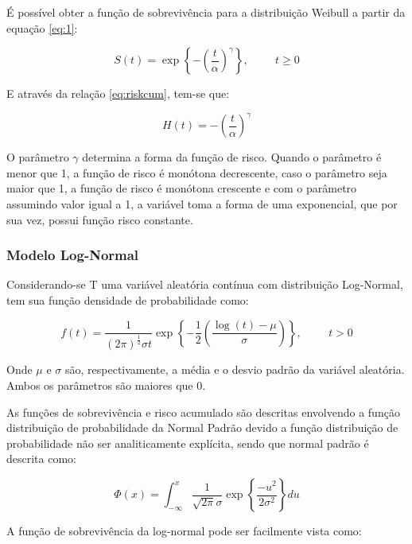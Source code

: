 \documentclass[12pt,a4paper]{article}
\begin{document}
É possível obter a função de sobrevivência para a distribuição Weibull a partir da equação \ref{eq:1}:

\begin{equation} \label{eq:WeiHaz}
S(t) = \exp \left\lbrace - \left( \dfrac{t}{\alpha} \right)^{\gamma} \right\rbrace, \hspace{1cm} t \ge 0
\end{equation}

E através da relação \ref{eq:riskcum}, tem-se que:

\begin{equation} \label{eq:WeRis}
	H(t) = - \left( \dfrac{t}{\alpha} \right)^{\gamma}
\end{equation}

O parâmetro $\gamma$ determina a forma da função de risco. Quando o parâmetro é menor que 1, a função de risco é monótona decrescente, caso o parâmetro seja maior que 1, a função de risco é monótona crescente e com o parâmetro assumindo valor igual a 1, a variável toma a forma de uma exponencial, que por sua vez, possui função risco constante.

\subsubsection{Modelo Log-Normal}

Considerando-se T uma variável aleatória contínua com distribuição Log-Normal, tem sua função densidade de probabilidade como:

\begin{equation}
 f(t) = \dfrac{1}{(2\pi)^{\frac{1}{2}}\sigma t}\exp\left\lbrace -\dfrac{1}{2} \left( \dfrac{\log(t) - \mu}{\sigma} \right) \right\rbrace, \hspace{1cm} t > 0
\end{equation}

Onde $\mu$ e $\sigma$ são, respectivamente, a média e o desvio padrão da variável aleatória. Ambos os parâmetros são maiores que 0.

As funções de sobrevivência e risco acumulado são descritas envolvendo a função distribuição de probabilidade da Normal Padrão devido a função distribuição de probabilidade não ser analiticamente explícita, sendo que normal padrão é descrita como:

$$ \Phi(x) =  \int_{-\infty}^{x} \dfrac{1}{\sqrt{2\pi}\sigma} \exp \left\lbrace \dfrac{-u^2}{2\sigma^2} \right\rbrace du $$

A função de sobrevivência da log-normal pode ser facilmente vista como:
\end{document}
